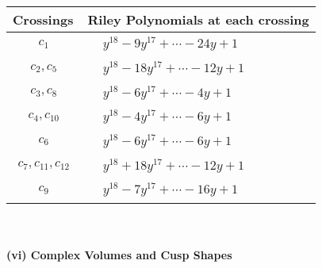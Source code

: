 \documentclass[1p]{elsarticle_modified}
\theoremstyle{definition}
\begin{document}
\begin{tabular}{m{50pt}|m{274pt}}
Crossings & \hspace{64pt}Riley Polynomials at each crossing \\
\hline $$\begin{aligned}c_{1}\end{aligned}$$&$\begin{aligned}
&y^{18}-9 y^{17}+\cdots-24 y+1
\end{aligned}$\\
\hline $$\begin{aligned}c_{2},c_{5}\end{aligned}$$&$\begin{aligned}
&y^{18}-18 y^{17}+\cdots-12 y+1
\end{aligned}$\\
\hline $$\begin{aligned}c_{3},c_{8}\end{aligned}$$&$\begin{aligned}
&y^{18}-6 y^{17}+\cdots-4 y+1
\end{aligned}$\\
\hline $$\begin{aligned}c_{4},c_{10}\end{aligned}$$&$\begin{aligned}
&y^{18}-4 y^{17}+\cdots-6 y+1
\end{aligned}$\\
\hline $$\begin{aligned}c_{6}\end{aligned}$$&$\begin{aligned}
&y^{18}-6 y^{17}+\cdots-6 y+1
\end{aligned}$\\
\hline $$\begin{aligned}c_{7},c_{11},c_{12}\end{aligned}$$&$\begin{aligned}
&y^{18}+18 y^{17}+\cdots-12 y+1
\end{aligned}$\\
\hline $$\begin{aligned}c_{9}\end{aligned}$$&$\begin{aligned}
&y^{18}-7 y^{17}+\cdots-16 y+1
\end{aligned}$\\
\hline
\end{tabular}\\~\\
\newpage\flushleft \textbf{(vi) Complex Volumes and Cusp Shapes}
\end{document}
